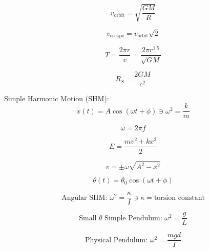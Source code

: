\documentclass[12pt]{article}
\begin{document}
\begin{equation}
	v_{\text{orbit}} = \sqrt{\dfrac{GM}{R}}
\end{equation}

\begin{equation}
	v_{\text{escape}} = v_{\text{orbit}} \sqrt 2
\end{equation}

\begin{equation}
	T = \dfrac{2 \pi r}v = \dfrac{2 \pi r^{1.5}}{\sqrt{G M}}
\end{equation}

\begin{equation}
	R_S = \dfrac{2 G M}{c^2}
\end{equation}

\pagebreak
\restoregeometry

Simple Harmonic Motion (SHM):
\begin{equation}
	x(t) = A \cos(\omega t + \phi) \ni \omega^2 = \dfrac k m
\end{equation}

\begin{equation}
	\omega = 2 \pi f
\end{equation}

\begin{equation}
	E = \dfrac{m v^2 + k x^2}2
\end{equation}

\begin{equation}
	v = \pm \omega \sqrt{A^2 - x^2}
\end{equation}

\begin{equation}
	\theta(t) = \theta_0 \cos(\omega t + \phi)
\end{equation}

\begin{equation}
	\text{Angular SHM: } \omega^2 = \dfrac \kappa I \ni \kappa = \text{torsion constant}
\end{equation}

\begin{equation}
	\text{Small $\theta$ Simple Pendulum: } \omega^2 = \dfrac g L
\end{equation}

\begin{equation}
	\text{Physical Pendulum: } \omega^2 = \dfrac {mgd} I
\end{equation}

\ifx \combinedDocuments \undefined
\end{document}
